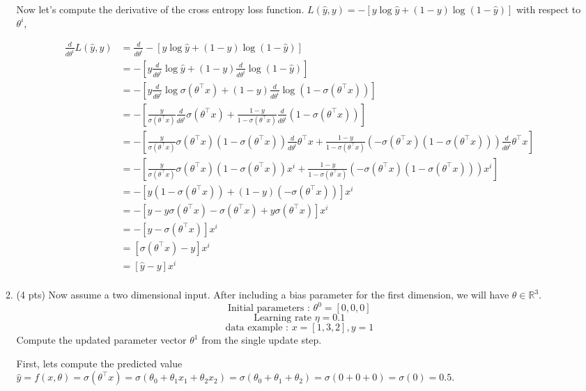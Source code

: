 \documentclass[a4paper]{article}
\theoremstyle{definition}
\newenvironment{soln}{
    \leavevmode\color{blue}\ignorespaces
}{}
\begin{document}
\begin{enumerate}
\begin{enumerate}
\begin{soln}
		Now let's compute the derivative of the cross entropy loss function. $L(\hat{y}, y) = -[y \log  \hat{y} + (1-y)\log(1-\hat{y})]$ with respect to $\theta^i$,

		\begin{align*}
			\frac{d}{d\theta^i} L(\hat{y}, y) &= \frac{d}{d\theta^i} -[y \log  \hat{y} + (1-y)\log(1-\hat{y})] \\
			&= -[y \frac{d}{d\theta^i} \log  \hat{y} + (1-y)\frac{d}{d\theta^i}\log(1-\hat{y})] \\
			&= -[y \frac{d}{d\theta^i} \log  \sigma(\theta^\top x) + (1-y)\frac{d}{d\theta^i}\log(1-\sigma(\theta^\top x))] \\
			&= -[\frac{y}{\sigma(\theta^\top x)} \frac{d}{d\theta^i} \sigma(\theta^\top x) + \frac{1-y}{1-\sigma(\theta^\top x)}\frac{d}{d\theta^i}(1-\sigma(\theta^\top x))] \\
			&= -[\frac{y}{\sigma(\theta^\top x)} \sigma(\theta^\top x) (1 - \sigma(\theta^\top x)) \frac{d}{d\theta^i} \theta^\top x + \frac{1-y}{1-\sigma(\theta^\top x)} (-\sigma(\theta^\top x) (1 - \sigma(\theta^\top x))) \frac{d}{d\theta^i} \theta^\top x] \\
			&= -[\frac{y}{\sigma(\theta^\top x)} \sigma(\theta^\top x) (1 - \sigma(\theta^\top x)) x^i + \frac{1-y}{1-\sigma(\theta^\top x)} (-\sigma(\theta^\top x) (1 - \sigma(\theta^\top x))) x^i] \\
			&= -[y(1 - \sigma(\theta^\top x)) + (1-y) (-\sigma(\theta^\top x) )]x^i \\
			&= -[y - y\sigma(\theta^\top x) - \sigma(\theta^\top x) + y\sigma(\theta^\top x)]x^i \\
			&= -[y - \sigma(\theta^\top x)]x^i \\
			&= [\sigma(\theta^\top x) - y]x^i \\
			&= [\hat{y} - y]x^i \\
		\end{align*}
	\end{soln}
	
	\item (4 pts)
 Now assume a two dimensional input. After including a bias parameter for the first dimension, we will have $\theta\in\mathbb{R}^3$.
$$ \text{Initial parameters : }  \theta^{0}=[0, 0, 0]$$
$$ \text{Learning rate }\eta=0.1$$
$$ \text{data example : } x=[1, 3, 2], y=1$$
Compute the updated parameter vector $\theta^{1}$ from the single update step.
	
	\begin{soln} 
		First, lets compute the predicted value $\hat{y} = f(x, \theta) = \sigma(\theta^\top x) = \sigma(\theta_0 + \theta_1 x_1 + \theta_2 x_2) = \sigma(\theta_0 + \theta_1 + \theta_2) = \sigma(0 + 0 + 0) = \sigma(0) = 0.5$.


\end{soln}
\end{enumerate}
\end{enumerate}
\end{document}
